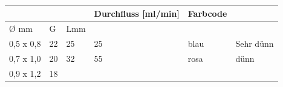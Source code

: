\documentclass{article}
\newcommand\gZ[1]{\textcolor[rgb]{0.5019608,0.5019608,0.5019608}{#1}}
\begin{document}
\begin{flushleft}
\begin{tabular}{|m{1.5619999cm}|m{1.7229999cm}|m{1.7229999cm}|m{2.0509999cm}|m{1.7839999cm}|m{2.102cm}|}
\hline
\multicolumn{3}{|m{5.408cm}|}{\centering {\bfseries Nur zur
Illustration!}\par

} &
\centering Durchfluss [ml/min]\par

 &
\centering Farbcode\par

 &
\\\hline
\centering \gZ{{\O} mm}\par

 &
\centering \gZ{G}\par

 &
\centering \gZ{Lmm}\par

 &
 &
 &
\\\hline
\centering \gZ{0,5 x 0,8}\par

 &
\centering \gZ{22}\par

 &
\centering \gZ{25}\par

 &
\centering \gZ{25}\par

 &
\centering blau\par

 &
\centering Sehr d\"unn\par

\\\hline
\centering \gZ{0,7 x 1,0}\par

 &
\centering \gZ{20}\par

 &
\centering \gZ{32}\par

 &
\centering \gZ{55}\par

 &
\centering rosa\par

 &
\centering d\"unn\par

\\\hline
\centering \gZ{0,9 x 1,2}\par

 &
\centering \gZ{18}\par


\end{tabular}
\end{flushleft}
\end{document}

